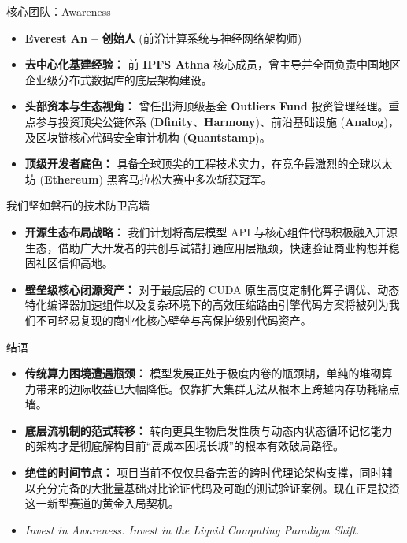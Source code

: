 ﻿\documentclass[aspectratio=169, 10pt]{beamer}
\begin{document}
\begin{frame}{核心团队：Awareness}
\begin{itemize}
    \item \textbf{Everest An -- 创始人} (前沿计算系统与神经网络架构师)
    \vspace{0.5em}
    \item \textbf{去中心化基建经验：} 前 \textbf{IPFS Athna} 核心成员，曾主导并全面负责中国地区企业级分布式数据库的底层架构建设。
    \item \textbf{头部资本与生态视角：} 曾任出海顶级基金 \textbf{Outliers Fund} 投资管理经理。重点参与投资顶尖公链体系 (\textbf{Dfinity}、\textbf{Harmony})、前沿基础设施 (\textbf{Analog})，及区块链核心代码安全审计机构 (\textbf{Quantstamp})。
    \item \textbf{顶级开发者底色：} 具备全球顶尖的工程技术实力，在竞争最激烈的全球以太坊 (\textbf{Ethereum}) 黑客马拉松大赛中多次斩获冠军。
\end{itemize}
\end{frame}

\begin{frame}{我们坚如磐石的技术防卫高墙}
\begin{itemize}
    \item \textbf{开源生态布局战略：} 我们计划将高层模型 API 与核心组件代码积极融入开源生态，借助广大开发者的共创与试错打通应用层瓶颈，快速验证商业构想并稳固社区信仰高地。
    \item \textbf{壁垒级核心闭源资产：} 对于最底层的 CUDA 原生高度定制化算子调优、动态特化编译器加速组件以及复杂环境下的高效压缩路由引擎代码方案将被列为我们不可轻易复现的商业化核心壁垒与高保护级别代码资产。
\end{itemize}
\end{frame}

\begin{frame}{结语}
\begin{itemize}
    \item \textbf{传统算力困境遭遇瓶颈：} 模型发展正处于极度内卷的瓶颈期，单纯的堆砌算力带来的边际收益已大幅降低。仅靠扩大集群无法从根本上跨越内存功耗痛点墙。
    \item \textbf{底层流机制的范式转移：} 转向更具生物启发性质与动态内状态循环记忆能力的架构才是彻底解构目前“高成本困境长城”的根本有效破局路径。
    \item \textbf{绝佳的时间节点：} 项目当前不仅仅具备完善的跨时代理论架构支撑，同时辅以充分完备的大批量基础对比论证代码及可跑的测试验证案例。现在正是投资这一新型赛道的黄金入局契机。
    \vspace{0.5em}
    \item \textit{Invest in Awareness. Invest in the Liquid Computing Paradigm Shift.}
\end{itemize}
\end{frame}
\end{document}
